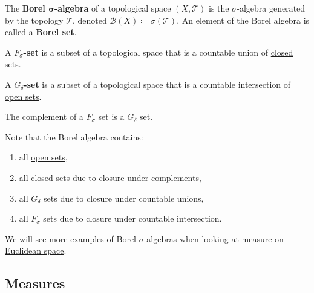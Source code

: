   \begin{definition}
    \label{def:borel-sigma-algebra}
    The \textbf{Borel $\boldsymbol{\sigma}$-algebra} of a topological space $(X, \mathscr{T})$ is the $\sigma$-algebra generated by the topology $\mathscr{T}$, denoted $\mathcal{B}(X) \coloneqq \sigma(\mathscr{T})$. An element of the Borel algebra is called a \textbf{Borel set}. 
  \end{definition}

  \begin{definition}
    \label{def:fsigma-sets}
    A \textbf{$F_\sigma$-set} is a subset of a topological space that is a countable union of \hyperref[pst-def:closed]{closed sets}. 
  \end{definition}

  \begin{definition}
    \label{def:gdelta-sets}
    A \textbf{$G_\delta$-set} is a subset of a topological space  that is a countable intersection of \hyperref[pst-def:open-set]{open sets}. 
  \end{definition}

  \begin{lemma}
    \label{thm:complement-of-an-fsigma-set}
    The complement of a $F_\sigma$ set is a $G_\delta$ set. 
  \end{lemma} 

  Note that the Borel algebra contains: 
  \begin{enumerate}
    \item all \hyperref[pst-def:open-set]{open sets}, 
    \item all \hyperref[pst-def:closed]{closed sets} due to closure under complements, 
    \item all $G_\delta$ sets due to closure under countable unions, 
    \item all $F_\sigma$ sets due to closure under countable intersection. 
  \end{enumerate} 

	We will see more examples of Borel $\sigma$-algebras when looking at measure on \hyperref[pst-ex:euclidean-space]{Euclidean space}. 

\subsection{Measures} 

